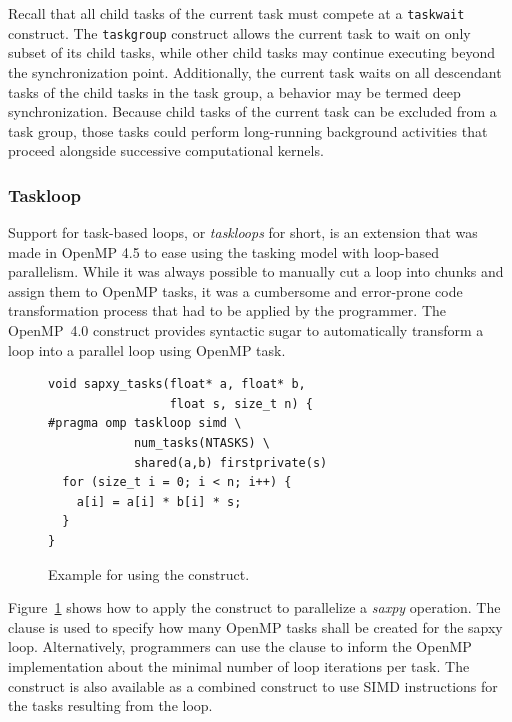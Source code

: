 


Recall that all child tasks of the current task must compete at a \texttt{taskwait} construct.  The \texttt{taskgroup} construct allows the current task to wait on only subset of its child tasks, while other child tasks may continue executing beyond the synchronization point.  Additionally, the current task waits on all descendant tasks of the child tasks in the task group, a behavior may be termed deep synchronization.  Because child tasks of the current task can be excluded from a task group, those tasks could perform long-running background activities that proceed alongside successive computational kernels.






\subsubsection{Taskloop}
\label{sec:Taskloop}

Support for task-based loops, or \emph{taskloops} for short, is  an extension that was made in OpenMP 4.5 to ease using the tasking model with loop-based parallelism.
While it was always possible to manually cut a loop into chunks and assign them to OpenMP tasks, it was a cumbersome and error-prone code transformation process that had to be applied by the programmer.
The OpenMP~4.0  construct provides syntactic sugar to automatically transform a loop into a parallel loop using OpenMP task.

\begin{figure}
\begin{verbatim}
void sapxy_tasks(float* a, float* b,
                 float s, size_t n) {
#pragma omp taskloop simd \
            num_tasks(NTASKS) \
            shared(a,b) firstprivate(s)
  for (size_t i = 0; i < n; i++) {
    a[i] = a[i] * b[i] * s;
  }
}
\end{verbatim}
\caption{Example for using the  construct.\label{fig:TaskloopExample}}
\end{figure}

Figure~\ref{fig:TaskloopExample} shows how to apply the  construct to parallelize a \emph{saxpy} operation.
The  clause is used to specify how many OpenMP tasks shall be created for the sapxy loop.
Alternatively, programmers can use the \code{grainsize} clause to inform the OpenMP implementation about the minimal number of loop iterations per task.
The \code{taskloop} construct is also available as a combined construct to use SIMD instructions for the tasks resulting from the loop.
